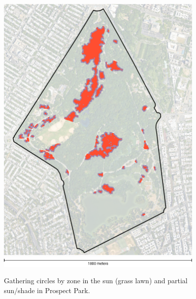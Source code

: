 \newpage
\null
\vfill
\begin{figure}[H]
  \centering
  \captionsetup{width=0.9\textwidth}
  \includegraphics[width=0.9\textwidth]{images/gatherings/prospect_circles.png} \\
  \vspace{10pt}
  \includegraphics[width=0.9\textwidth]{images/gatherings/scale_legend_2.png}
  \caption[Prospect Park - gathering circles]{Gathering circles by zone in the sun (grass lawn) and partial sun/shade in Prospect Park.}
  \label{fig:prospect_circles}
\end{figure}

